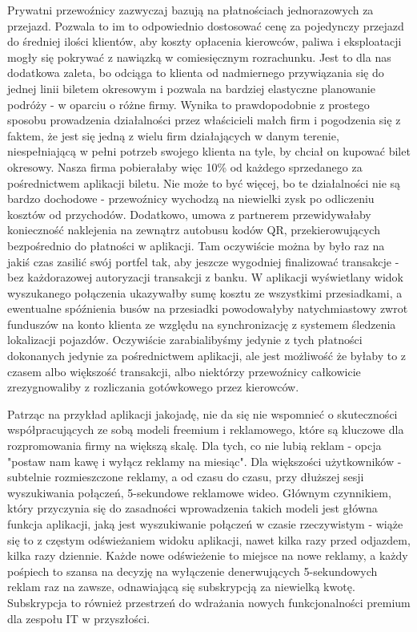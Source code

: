 Prywatni przewoźnicy zazwyczaj bazują na płatnościach jednorazowych za przejazd. Pozwala to im to odpowiednio dostosować cenę za pojedynczy przejazd do średniej ilości klientów, aby koszty opłacenia kierowców, paliwa i eksploatacji mogły się pokrywać z nawiązką w comiesięcznym rozrachunku. Jest to dla nas dodatkowa zaleta, bo odciąga to klienta od nadmiernego przywiązania się do jednej linii biletem okresowym i pozwala na bardziej elastyczne planowanie podróży - w oparciu o różne firmy. Wynika to prawdopodobnie z prostego sposobu prowadzenia działalności przez właścicieli małch firm i pogodzenia się z faktem, że jest się jedną z wielu firm działających w danym terenie, niespełniającą w pełni potrzeb swojego klienta na tyle, by chciał on kupować bilet okresowy. Nasza firma pobierałaby więc 10\% od każdego sprzedanego za pośrednictwem aplikacji biletu. Nie może to być więcej, bo te działalności nie są bardzo dochodowe - przewoźnicy wychodzą na niewielki zysk po odliczeniu kosztów od przychodów. Dodatkowo, umowa z partnerem przewidywałaby konieczność naklejenia na zewnątrz autobusu kodów QR, przekierowujących bezpośrednio do płatności w aplikacji. Tam oczywiście można by było raz na jakiś czas zasilić swój portfel tak, aby jeszcze wygodniej finalizować transakcje - bez każdorazowej autoryzacji transakcji z banku. W aplikacji wyświetlany widok wyszukanego połączenia ukazywałby sumę kosztu ze wszystkimi przesiadkami, a ewentualne spóźnienia busów na przesiadki powodowałyby natychmiastowy zwrot funduszów na konto klienta ze względu na synchronizację z systemem śledzenia lokalizacji pojazdów. Oczywiście zarabialibyśmy jedynie z tych płatności dokonanych jedynie za pośrednictwem aplikacji, ale jest możliwość że byłaby to z czasem albo większość transakcji, albo niektórzy przewoźnicy całkowicie zrezygnowaliby z rozliczania gotówkowego przez kierowców.

    
Patrząc na przykład aplikacji jakojadę, nie da się nie wspomnieć o skuteczności
współpracujących ze sobą modeli freemium i reklamowego, które są kluczowe dla
rozpromowania firmy na większą skalę. Dla tych, co nie lubią reklam - opcja "postaw nam kawę i wyłącz reklamy na miesiąc". Dla większości użytkowników - subtelnie rozmieszczone reklamy, a od czasu do czasu, przy dłuższej sesji wyszukiwania połączeń, 5-sekundowe reklamowe wideo. Głównym czynnikiem, który przyczynia się do zasadności wprowadzenia takich modeli jest główna funkcja aplikacji, jaką jest wyszukiwanie połączeń w czasie rzeczywistym - wiąże się to z częstym odświeżaniem widoku aplikacji, nawet kilka razy przed odjazdem, kilka razy dziennie. Każde nowe odświeżenie to miejsce na nowe reklamy, a każdy pośpiech to szansa na decyzję na wyłączenie denerwujących 5-sekundowych reklam raz na zawsze, odnawiającą się subskrypcją za niewielką kwotę. Subskrypcja to również przestrzeń do wdrażania nowych funkcjonalności premium dla zespołu IT w przyszłości.


